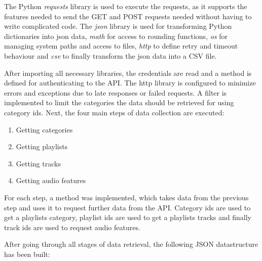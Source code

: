 The Python \emph{requests} library is used to execute the requests, as it supports the features needed to send the GET and POST
requests needed without having to write complicated code.
The \emph{json} library is used for transforming Python dictionaries into json data, \emph{math} for access to rounding functions,
\emph{os} for managing system paths and access to files, \emph{http} to define retry and timeout behaviour and \emph{csv}
to finally transform the json data into a CSV file.

After importing all necessary libraries, the credentials are read and a method is defined for authenticating to the API.
The http library is configured to minimize errors and exceptions due to late responses or failed requests.
A filter is implemented to limit the categories the data should be retrieved for using category ids.
Next, the four main steps of data collection are executed:

\begin{enumerate}
    \item Getting categories
    \item Getting playlists
    \item Getting tracks
    \item Getting audio features
\end{enumerate}

For each step, a method was implemented, which takes data from the previous step and uses it to request further data from the
API. Category ids are used to get a playlists category, playlist ids are used to get a playlists tracks and finally track ids
are used to request audio features.

After going through all stages of data retrieval, the following JSON datastructure has been built:

